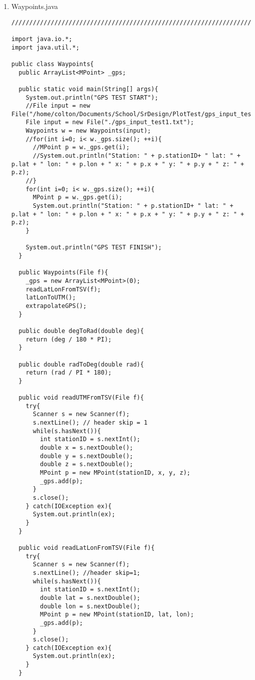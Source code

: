 \documentclass[11pt]{article}
\begin{document}
\begin{enumerate}
\begin{lstlisting}
class SegdataComp implements Comparator<Segdata>{

  //@Override
  public int compare(Segdata p1, Segdata p2) {
    if(p1.sp > p2.sp){
       return 1;
    } else {
       return -1;
    }
  }
}
\end{lstlisting}

\item Waypoints.java
\begin{lstlisting}
///////////////////////////////////////////////////////////////////////////

import java.io.*;
import java.util.*;

public class Waypoints{
  public ArrayList<MPoint> _gps;

  public static void main(String[] args){
    System.out.println("GPS TEST START");
    //File input = new File("/home/colton/Documents/School/SrDesign/PlotTest/gps_input_test1.txt");
    File input = new File("./gps_input_test1.txt");    
    Waypoints w = new Waypoints(input);
    //for(int i=0; i< w._gps.size(); ++i){
      //MPoint p = w._gps.get(i);
      //System.out.println("Station: " + p.stationID+ " lat: " + p.lat + " lon: " + p.lon + " x: " + p.x + " y: " + p.y + " z: " + p.z);
    //}
    for(int i=0; i< w._gps.size(); ++i){
      MPoint p = w._gps.get(i);
      System.out.println("Station: " + p.stationID+ " lat: " + p.lat + " lon: " + p.lon + " x: " + p.x + " y: " + p.y + " z: " + p.z);
    }

    System.out.println("GPS TEST FINISH");    
  }

  public Waypoints(File f){
    _gps = new ArrayList<MPoint>(0);
    readLatLonFromTSV(f);
    latLonToUTM();
    extrapolateGPS();
  }

  public double degToRad(double deg){
    return (deg / 180 * PI);
  }

  public double radToDeg(double rad){
    return (rad / PI * 180);
  }

  public void readUTMFromTSV(File f){
    try{
      Scanner s = new Scanner(f);
      s.nextLine(); // header skip = 1
      while(s.hasNext()){
        int stationID = s.nextInt();
        double x = s.nextDouble();
        double y = s.nextDouble();
        double z = s.nextDouble();
        MPoint p = new MPoint(stationID, x, y, z);
        _gps.add(p);
      }
      s.close();
    } catch(IOException ex){
      System.out.println(ex);  
    }
  }

  public void readLatLonFromTSV(File f){
    try{
      Scanner s = new Scanner(f);
      s.nextLine(); //header skip=1;
      while(s.hasNext()){
        int stationID = s.nextInt();
        double lat = s.nextDouble();
        double lon = s.nextDouble();
        MPoint p = new MPoint(stationID, lat, lon);
        _gps.add(p);
      }
      s.close();
    } catch(IOException ex){
      System.out.println(ex);  
    }
  }
  

\end{lstlisting}
\end{enumerate}
\end{document}
